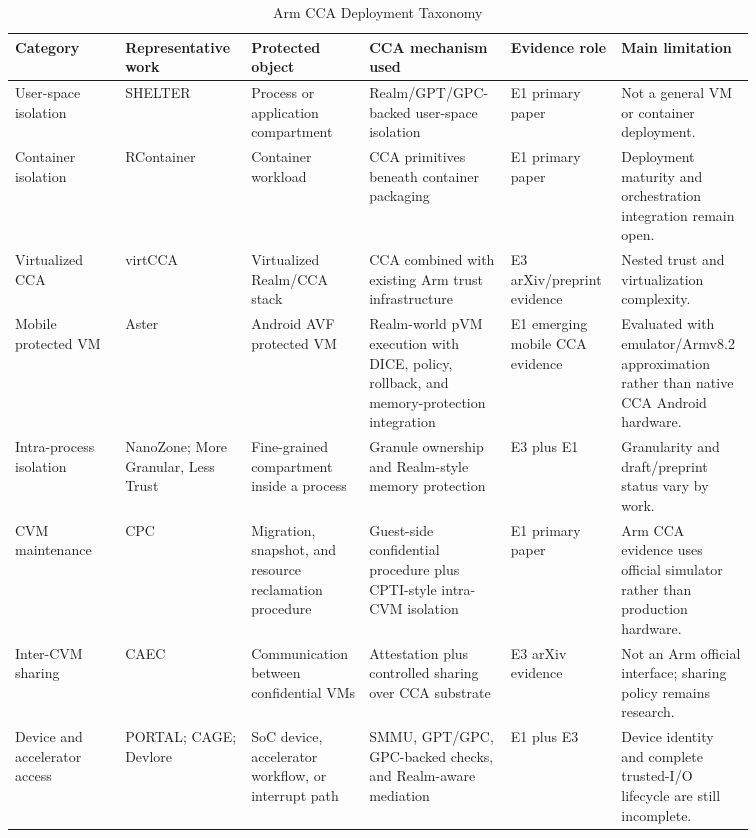 \begin{table}[t]
\centering
\caption{Arm CCA Deployment Taxonomy}
\label{tab:arm_cca_deployment_taxonomy}
\scriptsize
\begin{tabular}{@{}p{0.14\linewidth}p{0.15\linewidth}p{0.15\linewidth}p{0.18\linewidth}p{0.12\linewidth}p{0.12\linewidth}@{}}
\toprule
\textbf{Category} & \textbf{Representative work} & \textbf{Protected object} & \textbf{CCA mechanism used} & \textbf{Evidence role} & \textbf{Main limitation} \\ \midrule
User-space isolation & SHELTER & Process or application compartment & Realm/GPT/GPC-backed user-space isolation & E1 primary paper & Not a general VM or container deployment. \\
Container isolation & RContainer & Container workload & CCA primitives beneath container packaging & E1 primary paper & Deployment maturity and orchestration integration remain open. \\
Virtualized CCA & virtCCA & Virtualized Realm/CCA stack & CCA combined with existing Arm trust infrastructure & E3 arXiv/preprint evidence & Nested trust and virtualization complexity. \\
Mobile protected VM & Aster & Android AVF protected VM & Realm-world pVM execution with DICE, policy, rollback, and memory-protection integration & E1 emerging mobile CCA evidence & Evaluated with emulator/Armv8.2 approximation rather than native CCA Android hardware. \\
Intra-process isolation & NanoZone; More Granular, Less Trust & Fine-grained compartment inside a process & Granule ownership and Realm-style memory protection & E3 plus E1 & Granularity and draft/preprint status vary by work. \\
CVM maintenance & CPC & Migration, snapshot, and resource reclamation procedure & Guest-side confidential procedure plus CPTI-style intra-CVM isolation & E1 primary paper & Arm CCA evidence uses official simulator rather than production hardware. \\
Inter-CVM sharing & CAEC & Communication between confidential VMs & Attestation plus controlled sharing over CCA substrate & E3 arXiv evidence & Not an Arm official interface; sharing policy remains research. \\
Device and accelerator access & PORTAL; CAGE; Devlore & SoC device, accelerator workflow, or interrupt path & SMMU, GPT/GPC, GPC-backed checks, and Realm-aware mediation & E1 plus E3 & Device identity and complete trusted-I/O lifecycle are still incomplete. \\ \bottomrule
\end{tabular}
\end{table}

